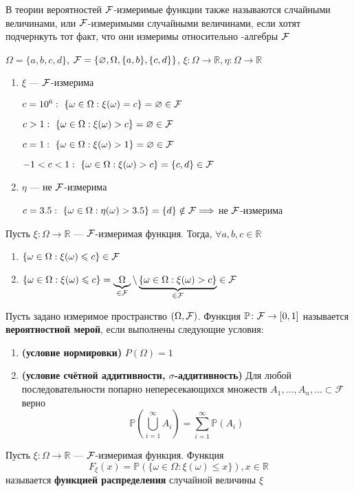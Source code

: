 \documentclass[a4paper, 10pt]{article}
\begin{document}
 В теории вероятностей $\mathcal{F}$-измеримые функции также называются слчайными величинами, или $\mathcal{F}$-измеримыми случайными величинами, если хотят подчернкуть тот факт, что они измеримы относительно \s-алгебры $\mathcal{F}$

\ex $\Omega=\{a,b,c,d\}$, $\mathcal{F}=\{\varnothing, \Omega, \{a,b\}, \{c,d\}\}$, $\xi:\Omega\rightarrow\mathbb{R},\eta:\Omega\rightarrow\mathbb{R}$
\begin{enumerate}
    \item $\xi$ — $\mathcal{F}$-измерима
    
    $c=10^6:\ \{\omega\in\Omega:\xi(\omega)=c\}=\varnothing\in\fk$
    
    $c>1:\ \{\omega\in\Omega:\xi(\omega)>c\}=\varnothing\in\fk$

    $c=1:\ \{\omega\in\Omega:\xi(\omega)>1\}=\varnothing\in\fk$

    $-1<c<1:\ \{\omega\in\Omega:\xi(\omega)>c\}=\{c,d\}\in\fk$
    \item $\eta$ — не $\mathcal{F}$-измерима
    
    $c=3.5:\ \{\omega\in\Omega:\eta(\omega)>3.5\}=\{d\}\notin\fk\Longrightarrow$ не $\mathcal{F}$-измерима 
\end{enumerate}

\theorem Пусть $\xi:\Omega\rightarrow\mathbb{R}$ — $\mathcal{F}$-измеримая функция. Тогда, $\forall a,b,c\in\mathbb{R}$
\begin{enumerate}
    \item $\{\omega\in\Omega:\xi(\omega)\leqslant c\}\in\mathcal{F}$
    \item 
    \proof $\{\omega\in\Omega:\xi(\omega)\leqslant c\}=\underbrace{\Omega}_{\in\mathcal{F}}\setminus\underbrace{\{\omega\in\Omega:\xi(\omega)>c\}}_{\in\mathcal{F}}\in\mathcal{F}$
\end{enumerate}

 Пусть задано измеримое пространство $(\Omega, \mathcal{F})$. Функция $\mathbb{P}\colon\mathcal{F}\to[0,1]$ называется \textbf{вероятностной мерой}, если выполнены следующие условия:
\begin{enumerate}
    \item \textbf{(условие нормировки)} $P(\Omega)=1$
    \item \textbf{(условие счётной аддитивности, $\sigma$-аддитивность)} Для любой последовательности попарно непересекающихся множеств $A_1,\dots,A_n,\dots\subset\mathcal{F}$ верно
    $$\mathbb{P}\left(\bigcup^\infty_{i=1}A_i\right)=\sum^\infty_{i=1}\mathbb{P}(A_i)$$
    
\end{enumerate}

 Пусть $\xi:\Omega\rightarrow\mathbb{R}$ — $\mathcal{F}$-измеримая функция. Функция
$$F_\xi(x)=\mathbb{P}(\{\omega\in\Omega:\xi(\omega)\leqslant x\}),x\in\mathbb{R}$$
называется \textbf{функцией распределения} случайной величины $\xi$
\end{document}
